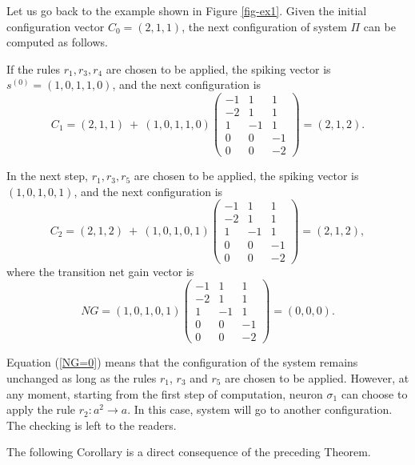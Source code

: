 \documentclass[runningheads]{llncs}
\begin{document}
Let us go back to the example shown in Figure \ref{fig-ex1}. Given
the initial configuration vector $C_0=(2,1,1)$, the next
configuration of system $\Pi$ can be computed as follows.

If the rules $r_1,r_3,r_4$ are chosen to be applied, the spiking
vector is $s^{(0)}=(1,0,1,1,0)$, and the next configuration is
\begin{equation}
C_1=(2, 1, 1)~+~(1, 0, 1, 1, 0)\left(
\begin{array}{ccc}
 -1 & 1 & 1 \\
 -2 & 1 & 1 \\
 1 & -1 & 1\\
 0 & 0 & -1\\
 0 & 0 & -2
\end{array}
\right)=(2, 1, 2).
\end{equation}

In the next step, $r_1, r_3, r_5$ are chosen to be applied, the
spiking vector is $(1,0,1,0,1)$, and the next configuration is
\begin{equation}
C_2=(2, 1, 2)~+~(1, 0, 1, 0, 1)\left(
\begin{array}{ccc}
 -1 & 1 & 1 \\
 -2 & 1 & 1 \\
 1 & -1 & 1\\
 0 & 0 & -1\\
 0 & 0 & -2
\end{array}
\right)=(2, 1, 2),
\end{equation}
where the transition net gain vector is
\begin{equation} \label{NG=0}
NG=(1, 0, 1, 0, 1)\left(
\begin{array}{ccc}
 -1 & 1 & 1 \\
 -2 & 1 & 1 \\
 1 & -1 & 1\\
 0 & 0 & -1\\
 0 & 0 & -2
\end{array}
\right)=(0, 0, 0).
\end{equation}

Equation (\ref{NG=0}) means that the configuration of the system
remains unchanged as long as the rules $r_1$, $r_3$ and $r_5$ are
chosen to be applied. However, at any moment, starting from the
first step of computation, neuron $\sigma_1$ can choose to apply the
rule $r_2:a^2\rightarrow a$. In this case, system will go to another
configuration. The checking is left to the readers.

The following Corollary is a direct consequence of the preceding
Theorem.
\end{document}

